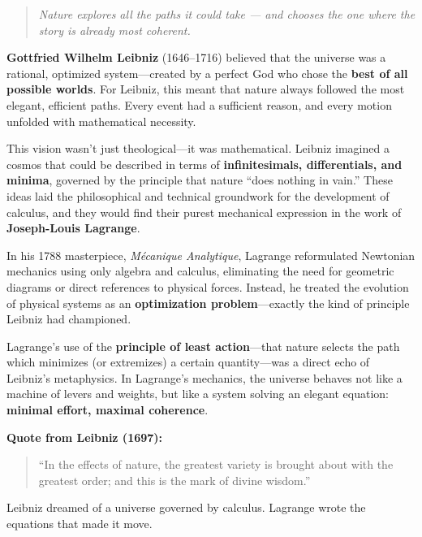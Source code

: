 \begin{quote}
    \textit{Nature explores all the paths it could take — and chooses the one where the story is already most coherent.}
\end{quote}

\begin{tcolorbox}[colback=blue!5!white, colframe=blue!50!black, 
    title={Historical Sidebar: Lagrange and the Calculus of the Best Possible World}]
    
        \textbf{Gottfried Wilhelm Leibniz} (1646–1716) believed that the universe was a rational, optimized system—created by a perfect God who chose the \textbf{best of all possible worlds}. For Leibniz, this meant that nature always followed the most elegant, efficient paths. Every event had a sufficient reason, and every motion unfolded with mathematical necessity.
    
        \medskip
    
        This vision wasn’t just theological—it was mathematical. Leibniz imagined a cosmos that could be described in terms of \textbf{infinitesimals, differentials, and minima}, governed by the principle that nature “does nothing in vain.” These ideas laid the philosophical and technical groundwork for the development of calculus, and they would find their purest mechanical expression in the work of \textbf{Joseph-Louis Lagrange}.
    
        \medskip
    
        In his 1788 masterpiece, \textit{Mécanique Analytique}, Lagrange reformulated Newtonian mechanics using only algebra and calculus, eliminating the need for geometric diagrams or direct references to physical forces. Instead, he treated the evolution of physical systems as an \textbf{optimization problem}—exactly the kind of principle Leibniz had championed.
    
        \medskip
    
        Lagrange’s use of the \textbf{principle of least action}—that nature selects the path which minimizes (or extremizes) a certain quantity—was a direct echo of Leibniz’s metaphysics. In Lagrange’s mechanics, the universe behaves not like a machine of levers and weights, but like a system solving an elegant equation: \textbf{minimal effort, maximal coherence}.
    
        \medskip
    
        \textbf{Quote from Leibniz (1697):}
        \begin{quote}
        “In the effects of nature, the greatest variety is brought about with the greatest order; and this is the mark of divine wisdom.”
        \end{quote}
    
        Leibniz dreamed of a universe governed by calculus. Lagrange wrote the equations that made it move.
    
\end{tcolorbox}


